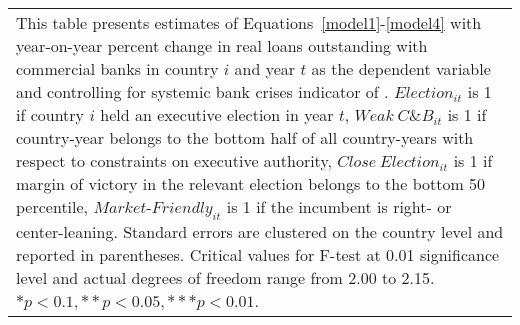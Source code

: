 \begin{longtable}{m{4cm}*{12}{c}}
\bottomrule                                          \multicolumn{13}{m{\linewidth}}{\footnotesize This table presents estimates of Equations~\eqref{model1}-\eqref{model4} with year-on-year percent change in real loans outstanding with commercial banks in country $ i $ and year $ t $ as the dependent variable and controlling for systemic bank crises indicator of \citet{laeven2012systemic}. $ Election_{it} $ is 1 if country $ i $ held an executive election in year $ t $, $ Weak\ C\&B_{it} $ is 1 if country-year belongs to the bottom half of all country-years with respect to constraints on executive authority, $ Close\ Election_{it} $ is 1 if margin of victory in the relevant election belongs to the bottom 50 percentile,  $ Market\text{-}Friendly_{it} $ is 1 if the incumbent is right- or center-leaning. Standard errors are clustered on the country level and reported in parentheses. Critical values for F-test at 0.01 significance level and actual degrees of freedom range from 2.00 to 2.15. \( * p<0.1, ** p<0.05, *** p<0.01 \). }\\                                          \end{longtable}
